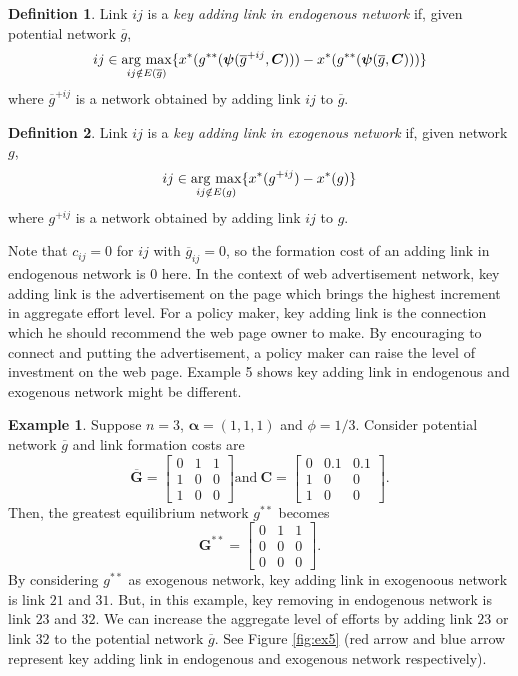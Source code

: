 \documentclass[12pt]{article}
\theoremstyle{definition}
\newtheorem{definition}{Definition}
\newtheorem{example}{Example}
\newcommand{\bm}[1]{\boldsymbol{#1}}
\newcommand{\argmax}{\mathop{\rm arg~max}\limits}
\begin{document}
\begin{definition}
	Link $ij$ is a {\it{key adding link in endogenous network}} if, given potential network $\overline{g}$,
    \[ ij \in \argmax_{ij \notin E(\overline{g})} \{ x^*(g^{**}(\bm{\psi}({\overline{g}}^{+ij}, \bm{C}))) - x^*(g^{**}(\bm{\psi}(\overline{g}, \bm{C}))) \} \]
    where ${\overline{g}}^{+ij}$ is a network obtained by adding link $ij$ to $\overline{g}$.
\end{definition}

\begin{definition}
	Link $ij$ is a {\it{key adding link in exogenous network}} if, given network $g$,
    \[ ij \in \argmax_{ij \notin E(g)} \{ x^*(g^{+ij}) - x^*(g) \} \]
    where $g^{+ij}$ is a network obtained by adding link $ij$ to $g$.
\end{definition}

Note that $c_{ij} = 0$ for $ij$ with $\overline{g}_{ij} = 0$, so the formation cost of an adding link in endogenous network is $0$ here.
In the context of web advertisement network, key adding link is the advertisement on the page which brings the highest increment in aggregate effort level.
For a policy maker, key adding link is the connection which he should recommend the web page owner to make.
By encouraging to connect and putting the advertisement, a policy maker can raise the level of investment on the web page.
Example 5 shows key adding link in endogenous and exogenous network might be different.

\begin{example}
Suppose $n=3$, $\bm{\alpha} = (1,1,1)$ and $\phi = 1/3$.
Consider potential network $\overline{g}$ and link formation costs are
\[
\bm{\overline{G}} = \left[
            \begin{array}{ccc}
                0 & 1 & 1 \\
                1 & 0 & 0 \\
                1 & 0 & 0
            \end{array} \right]
\text{and} \ 
\bm{C} = \left[
                \begin{array}{ccc}
                    0 & 0.1 & 0.1 \\
                    1 & 0 & 0 \\
                    1 & 0 & 0
                \end{array} \right]. \]
Then, the greatest equilibrium network $g^{**}$ becomes
\[ \bm{G}^{**} = \left[
    \begin{array}{ccc}
        0 & 1 & 1 \\
        0 & 0 & 0 \\
        0 & 0 & 0
    \end{array} \right].\]
By considering $g^{**}$ as exogenous network, key adding link in exogenoous network is link $21$ and $31$.
But, in this example, key removing in endogenous network is link $23$ and $32$.
We can increase the aggregate level of efforts by adding link $23$ or link $32$ to the potential network $\overline{g}$.
See Figure \ref{fig:ex5} (red arrow and blue arrow represent key adding link in endogenous and exogenous network respectively).
\end{example}
\end{document}
